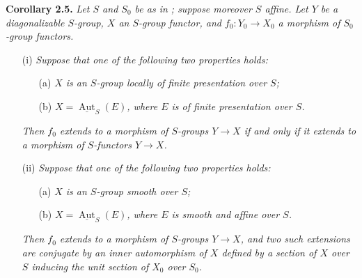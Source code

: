 \medskip
\noindent{}\textbf{Corollary 2.5.}
\textit{Let \(S\) and \(S_0\) be as in ; suppose moreover \(S\)
affine. Let \(Y\) be a diagonalizable \(S\)-group, \(X\) an \(S\)-group functor,
and \(f_0:Y_0\to X_0\) a morphism of \(S_0\)-group functors.}
\begin{enumerate}
\item[(i)] \textit{Suppose that one of the following two properties holds:}
  \begin{enumerate}
  \item[(a)] \textit{\(X\) is an \(S\)-group locally of finite presentation over
    \(S\);}
  \item[(b)] \textit{\(X=\underline{\operatorname{Aut}}_S(E)\), where \(E\) is of
    finite presentation over \(S\).}
  \end{enumerate}
  \textit{Then \(f_0\) extends to a morphism of \(S\)-groups \(Y\to X\) if and
  only if it extends to a morphism of \(S\)-functors \(Y\to X\).}
\item[\SGAInlineRefTarget{sga3:iii:corollary:2-5:item:ii}(ii)] \textit{Suppose that one of the following two properties holds:}
  \begin{enumerate}
  \item[(a)] \textit{\(X\) is an \(S\)-group smooth over \(S\);}
  \item[(b)] \textit{\(X=\underline{\operatorname{Aut}}_S(E)\), where \(E\) is
    smooth and affine over \(S\).}
  \end{enumerate}
  \textit{Then \(f_0\) extends to a morphism of \(S\)-groups \(Y\to X\), and two
  such extensions are conjugate by an inner automorphism of \(X\) defined by a
  section of \(X\) over \(S\) inducing the unit section of \(X_0\) over
  \(S_0\).}
\end{enumerate}

